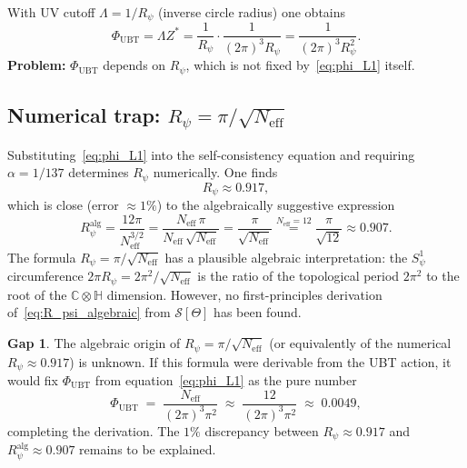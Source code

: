 \documentclass[11pt,a4paper]{article}
\theoremstyle{definition}
\newtheorem{gap}{Gap}
\theoremstyle{remark}
\begin{document}
With UV cutoff $\Lambda = 1/R_\psi$ (inverse circle radius) one obtains
\begin{equation}
  \Phi_{\mathrm{UBT}}
  = \Lambda Z^*
  = \frac{1}{R_\psi}\cdot\frac{1}{(2\pi)^3 R_\psi}
  = \frac{1}{(2\pi)^3 R_\psi^2}.
  \label{eq:phi_L1}
\end{equation}
\textbf{Problem:} $\Phi_{\mathrm{UBT}}$ depends on $R_\psi$, which is not
fixed by~\eqref{eq:phi_L1} itself.

\subsection{Numerical trap: $R_\psi = \pi/\sqrt{N_{\mathrm{eff}}}$}

Substituting~\eqref{eq:phi_L1} into the self-consistency equation and
requiring $\alpha = 1/137$ determines $R_\psi$ numerically.
One finds
\begin{equation}
  R_\psi \approx 0.917,
\end{equation}
which is close (error $\approx 1\%$) to the algebraically suggestive
expression
\begin{equation}
  R_\psi^{\mathrm{alg}}
  = \frac{12\pi}{N_{\mathrm{eff}}^{3/2}}
  = \frac{N_{\mathrm{eff}}\,\pi}{N_{\mathrm{eff}}\,\sqrt{N_{\mathrm{eff}}}}
  = \frac{\pi}{\sqrt{N_{\mathrm{eff}}}}
  \overset{N_{\mathrm{eff}}=12}{=} \frac{\pi}{\sqrt{12}}
  \approx 0.907.
  \label{eq:R_psi_algebraic}
\end{equation}
The formula $R_\psi = \pi/\sqrt{N_{\mathrm{eff}}}$ has a plausible algebraic
interpretation: the $S^1_\psi$ circumference
$2\pi R_\psi = 2\pi^2/\sqrt{N_{\mathrm{eff}}}$
is the ratio of the topological period $2\pi^2$ to the root of the
$\mathbb{C}\otimes\mathbb{H}$ dimension.
However, no first-principles derivation of~\eqref{eq:R_psi_algebraic}
from $\mathcal{S}[\Theta]$ has been found.

\begin{gap}
  The algebraic origin of $R_\psi = \pi/\sqrt{N_{\mathrm{eff}}}$
  (or equivalently of the numerical $R_\psi \approx 0.917$) is unknown.
  If this formula were derivable from the UBT action, it would
  fix $\Phi_{\mathrm{UBT}}$ from equation~\eqref{eq:phi_L1} as the
  pure number
  \begin{equation}
    \Phi_{\mathrm{UBT}}
    \;=\; \frac{N_{\mathrm{eff}}}{(2\pi)^3\pi^2}
    \;\approx\; \frac{12}{(2\pi)^3\pi^2}
    \;\approx\; 0.0049,
    \label{eq:phi_L1_algebraic}
  \end{equation}
  completing the derivation.
  The $1\%$ discrepancy between $R_\psi \approx 0.917$ and
  $R_\psi^{\mathrm{alg}} \approx 0.907$ remains to be explained.
\end{gap}
\end{document}
